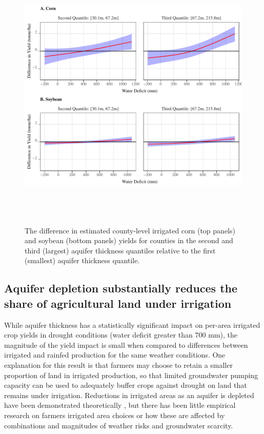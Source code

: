 \documentclass[
]{article}
\begin{document}
\begin{figure}[H]

{\centering \includegraphics[width=6in,height=500px,]{../../Figures/g_ir_yield_dif} 

}

\caption{The difference in estimated county-level irrigated corn (top panels) and soybean (bottom panels) yields for counties in the second and third (largest) aquifer thickness quantiles relative to the first (smallest) aquifer thickness quantile.}\label{fig:yield-dif}
\end{figure}

\hypertarget{impact-share}{%
\subsection{Aquifer depletion substantially reduces the share of agricultural land under irrigation}\label{impact-share}}

While aquifer thickness has a statistically significant impact on per-area irrigated crop yields in drought conditions (water deficit greater than 700 mm), the magnitude of the yield impact is small when compared to differences between irrigated and rainfed production for the same weather conditions. One explanation for this result is that farmers may choose to retain a smaller proportion of land in irrigated production, so that limited groundwater pumping capacity can be used to adequately buffer crops against drought on land that remains under irrigation. Reductions in irrigated areas as an aquifer is depleted have been demonstrated theoretically \citep{rad2020effects, foster2014modeling, hrozencik2017heterogeneous, deines2020transitions}, but there has been little empirical research on farmers irrigated area choices or how these are affected by combinations and magnitudes of weather risks and groundwater scarcity.
\end{document}
